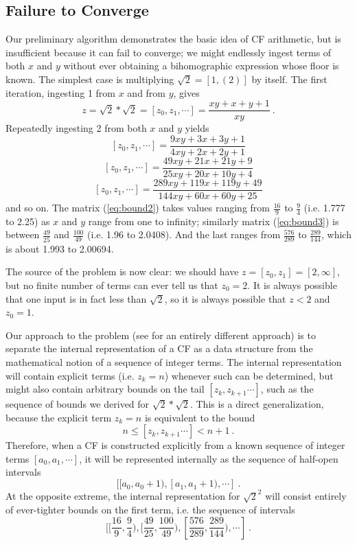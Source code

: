 \documentclass[11pt, oneside]{amsart}   	%
\newcommand{\bihom}[8]{{\frac{#1 xy + #2 x + #3 y + #4}{#5 xy + #6 x + #7 y + #8}}}
\begin{document}
\subsection{Failure to Converge}
Our preliminary algorithm demonstrates the basic idea of CF arithmetic, but is insufficient because it can fail to converge;
we might endlessly ingest terms of both $x$ and $y$ without ever obtaining a bihomographic expression whose floor is known. The
simplest case is multiplying $\sqrt{2} = [1,(2)]$ by itself. The first iteration, ingesting 1 from $x$ and from $y$, gives
\begin{equation*}
z = \sqrt{2}*\sqrt{2} = [z_0,z_1, \cdots] = \frac{xy+x+y+1}{xy} \ . %
\end{equation*}
Repeatedly ingesting 2 from both $x$ and $y$ yields
\begin{equation}\label{eq:bound2}
[z_0,z_1, \cdots]  =  \bihom{9}{3}{3}{1}{4}{2}{2}{1}
\end{equation}
\begin{equation}\label{eq:bound3}
[z_0,z_1, \cdots]  =  \bihom{49}{21}{21}{9}{25}{20}{10}{4}
\end{equation}
\begin{equation}\label{eq:bound4}
[z_0,z_1, \cdots]  =  \bihom{289}{119}{119}{49}{144}{60}{60}{25}
\end{equation}
and so on. The matrix (\ref{eq:bound2}) takes values ranging from $\frac{16}{9}$ to $\frac{9}{4}$ (i.e. 1.777 to 2.25)
as $x$ and $y$ range from one to infinity;
similarly matrix (\ref{eq:bound3}) is between $\frac{49}{25}$ and $\frac{100}{49}$ (i.e. 1.96 to 2.0408).
And the last ranges from $\frac{576}{289}$ to $\frac{289}{144}$, which is about 1.993 to 2.00694.

The source of the problem is now clear: we should have $z=[z_0,z_1]=[2,\infty]$, but no finite number of terms can ever tell us that
$z_0=2$. It is always possible that one input is in fact less than $\sqrt{2}$, so it is always possible that $z<2$ and $z_0=1$.

Our approach to the problem (see \cite{Lester01} for an entirely different approach)
is to separate the internal representation of a CF as a data structure from the mathematical notion of a  sequence of integer terms. The
internal representation will contain explicit terms (i.e. $z_k=n$) whenever such can be determined, but might also contain arbitrary
bounds on the tail $[z_k, z_{k+1}\cdots]$, such as the  sequence of bounds we derived for $\sqrt{2}*\sqrt{2}$. This is a direct
generalization, because the explicit term  $z_k=n$ is equivalent to the bound 
\[
n \leq [z_k, z_{k+1}\cdots] < n+1 \ .
\]
Therefore, when a CF is constructed explicitly from a known sequence of integer terms $[a_0, a_1, \cdots]$,
it will be represented internally as the sequence of half-open intervals
\[
[[a_0, a_0+1),  [a_1, a_1+1), \cdots]\ .
\] 
At the opposite extreme, the internal representation for $\sqrt{2}^2$ will consist entirely of ever-tighter bounds on the first term, i.e. the sequence of intervals
\[
[[\frac{16}{9},\frac{9}{4}), [\frac{49}{25},\frac{100}{49}), [\frac{576}{289},\frac{289}{144}), \cdots]\ .
\] 
\end{document}
